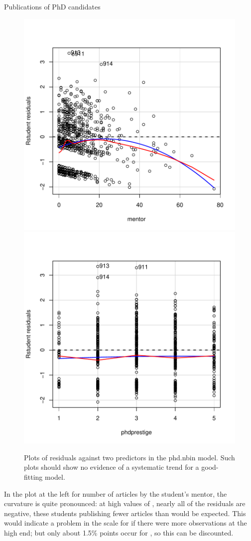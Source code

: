 \documentclass[11pt]{book}\usepackage[]{graphicx}\usepackage[]{color}
\newenvironment{knitrout}{}{} %
\renewenvironment{knitrout}{\small\renewcommand{\baselinestretch}{.85}}{} %
\begin{document}
\begin{Example}[phdpubs5]{Publications of PhD candidates}
\begin{knitrout}
\begin{figure}[!htbp]
\centerline{\includegraphics[width=.5\textwidth]{ch09/fig/phdpubs5-resplot21} 
\includegraphics[width=.5\textwidth]{ch09/fig/phdpubs5-resplot22} }

\caption[Plots of residuals against two predictors in the phd]{Plots of residuals against two predictors in the phd.nbin model. Such plots should show no evidence of a systematic trend for a good-fitting model.\label{fig:phdpubs5-resplot2}}
\end{figure}


\end{knitrout}
In the plot at the left for number of articles by the student's mentor, the curvature is quite pronounced: at high values of
, nearly all of the residuals are negative, these students publishing fewer articles than
would be expected. This would indicate a problem in the scale for 
if there were more observations at the high end;  but only about 1.5\% points occur for ,
so this can be discounted.


\end{Example}
\end{document}
